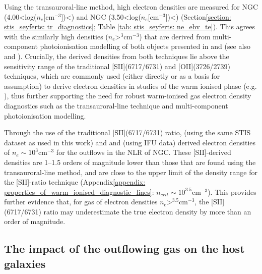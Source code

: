 Using the transauroral-line method, high electron densities are measured for NGC (4.00\;\textless\;log($n_e$[cm$^{-3}$])\;\textless{}) and NGC (3.50\;\textless\;log($n_e$[cm$^{-3}$])\;\textless{}) (Section\;\ref{section: stis_seyferts: tr_diagnostics}; Table \ref{tab: stis_seyferts: ne_ebv_te}). This agrees with the similarly high densities ($n_e$\;\textgreater{}$^3$\;cm$^{-3}$) that are derived from multi-component photoionisation modelling of both objects presented in \citet{Crenshaw2015} and \citet{Revalski2021} (see also \citealt{Collins2009} and \citealt{Revalski2022}). Crucially, the derived densities from both techniques lie above the sensitivity range of the traditional [SII](6717/6731) and [OII](3726/2739) techniques, which are commonly used (either directly or as a basis for assumption) to derive electron densities in studies of the warm ionised phase (e.g. \citealt{Nesvadba2006, Liu2013, Harrison2014, Fiore2017}), thus further supporting the need for robust warm-ionised gas electron density diagnostics such as the transauroral-line technique and multi-component photoionisation modelling.

Through the use of the traditional [SII](6717/6731) ratio, \citet{Kraemer2000II} (using the same STIS dataset as used in this work) and \citet{Kakkad2018} and \citet{Mingozzi2019} (using IFU data) derived electron densities of $n_e\sim10^3$\;cm$^{-3}$ for the outflows in the NLR of NGC. These [SII]-derived densities are 1--1.5 orders of magnitude lower than those that are found using the transauroral-line method, and are close to the upper limit of the density range for the [SII]-ratio technique (Appendix\;\ref{appendix: properties_of_warm_ionised_diagnostic_lines}: $n_{crit}\sim10^{3.5}$\;cm$^{-3}$). This provides further evidence that, for gas of electron densities $n_e$\;\textgreater{}$^{3.5}$\;cm$^{-3}$, the [SII](6717/6731) ratio may underestimate the true electron density by more than an order of magnitude.

\subsection{The impact of the outflowing gas on the host galaxies}

